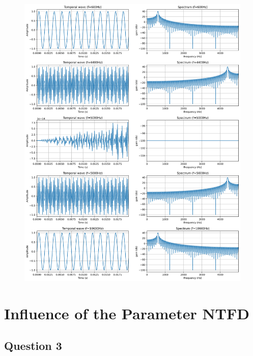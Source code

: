 \documentclass[]{article}
\begin{document}
\begin{figure}[H]
    \centering
    \includegraphics[scale=0.25]{q2.png}
\end{figure}

\section{Influence of the Parameter NTFD}
\subsection*{Question 3}
\end{document}
